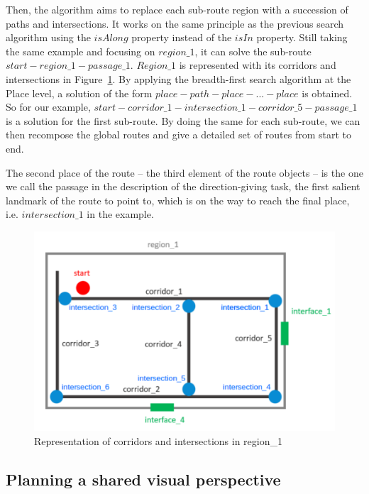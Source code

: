 \documentclass[a4paper,11pt,twoside]{StyleThese}
\begin{document}
Then, the algorithm aims to replace each sub-route region with a succession of paths and intersections. It works on the same principle as the previous search algorithm using the $isAlong$ property instead of the $isIn$ property. Still taking the same example and focusing on $region\_1$, it can solve the sub-route \( start - region\_1 - passage\_1\). $Region\_1$ is represented with its corridors and intersections in Figure~\ref{fig:chap3_region_1}. By applying the breadth-first search algorithm at the Place level, a solution of the form $place - path - place - ... - place$ is obtained. So for our example, \(start - corridor\_1 - intersection\_1 - corridor\_5 - passage\_1\) is a solution for the first sub-route. By doing the same for each sub-route, we can then recompose the global routes and give a detailed set of routes from start to end.

The second place of the route -- the third element of the route objects -- is the one we call the passage in the description of the direction-giving task, the first salient landmark of the route to point to, which is on the way to reach the final place, i.e. \(intersection\_1\) in the example.

\begin{figure}[ht]
	\centering
	\includegraphics[scale=0.25]{figures/chapter3/region_1.png}
	\caption{\label{fig:chap3_region_1} Representation of corridors and intersections in region\_1}
\end{figure}

\subsection{Planning a shared visual perspective}\label{subsec:svp}
\end{document}
